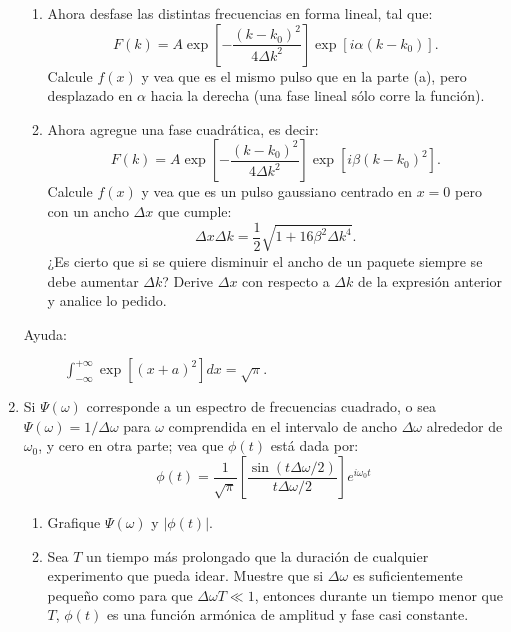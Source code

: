 \documentclass[11pt,spanish]{article}
\begin{document}
\begin{enumerate}
\begin{enumerate}
        \item Ahora desfase las distintas frecuencias en forma lineal, tal que:
        \[
        F(k)=A\exp\left[-\frac{(k-k_{0})^{2}}{4\Delta k^{2}}\right]\exp\left[i\alpha(k-k_{0})\right].
        \]
        Calcule $f(x)$ y vea que es el mismo pulso que en la parte (a), pero
        desplazado en $\alpha$ hacia la derecha (una fase lineal sólo corre
        la función).

        \item Ahora agregue una fase cuadrática, es decir:
        \[
        F(k)=A\exp\left[-\frac{(k-k_{0})^{2}}{4\Delta k^{2}}\right]\exp\left[i\beta(k-k_{0})^{2}\right].
        \]
        Calcule $f(x)$ y vea que es un pulso gaussiano centrado en $x=0$
        pero con un ancho $\Delta x$ que cumple:
        \[
        \Delta x\Delta k=\frac{1}{2}\sqrt{1+16\beta^{2}\Delta k^{4}}.
        \]
        ¿Es cierto que si se quiere disminuir el ancho de un paquete siempre
        se debe aumentar $\Delta k$? Derive $\Delta x$ con respecto a $\Delta k$
        de la expresión anterior y analice lo pedido.
    \end{enumerate}

    \begin{description}
        \item [{Ayuda:}] $\int_{-\infty}^{+\infty}\exp\left[(x+a)^{2}\right]dx=\sqrt{\pi}$.
    \end{description}


    \item Si $\Psi(\omega)$ corresponde a un espectro de frecuencias cuadrado,
    o sea $\Psi(\omega)=1/\Delta\omega$ para $\omega$ comprendida en
    el intervalo de ancho $\Delta\omega$ alrededor de $\omega_{0}$,
    y cero en otra parte; vea que $\phi(t)$ está dada por: 
    \[
    \phi(t)=\frac{1}{\sqrt{\pi}}\left[\frac{\sin(t\Delta\omega/2)}{t\Delta\omega/2}\right]e^{i\omega_{0}t}
    \]

    \begin{enumerate}
        \item Grafique $\Psi(\omega)$ y $\left|\phi(t)\right|$.

        \item Sea $T$ un tiempo más prolongado que la duración de cualquier experimento
        que pueda idear. Muestre que si $\Delta\omega$ es suficientemente
        pequeño como para que $\Delta\omega T\ll1$, entonces durante un tiempo
        menor que $T$, $\phi(t)$ es una función armónica de amplitud y fase
        casi constante.
    \end{enumerate}



\end{enumerate}
\end{document}
